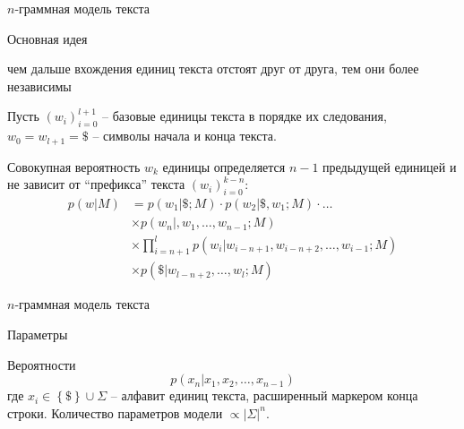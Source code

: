 \documentclass{beamer}
\newcommand{\obj}[1]{\left\{ #1 \right \}}
\newcommand{\brac}[1]{\left ( #1 \right )}
\newcommand{\induc}[1]{\left . #1 \right \vert}
\newcommand{\abs}[1]{\left | #1 \right |}
\begin{document}
\begin{frame}{$n$-граммная модель текста}
  \begin{block}{Основная идея}

     чем дальше вхождения единиц текста отстоят друг от друга, тем они более независимы
  \end{block}

  \begin{block}

    Пусть $\brac{w_i}_{i=0}^{l+1}$ -- базовые единицы текста в порядке их следования, $w_0=w_{l+1}=\$$ -- символы начала и конца текста.

    Совокупная вероятность $w_k$ единицы определяется $n-1$ предыдущей единицей и не зависит от ``префикса'' текста $\brac{w_i}_{i=0}^{k-n}$:
    \begin{align*}
      p\brac{\induc{w}M} &= p\brac{\induc{w_1}\$;M} \cdot p\brac{\induc{w_2}\$,w_1;M} \cdot \ldots \\
        &\times p\brac{\induc{w_n},w_1,\ldots,w_{n-1};M} \\
        &\times \prod_{i=n+1}^l p\brac{\induc{w_i}w_{i-n+1}, w_{i-n+2}, \ldots, w_{i-1};M} \\ 
        &\times p\brac{\induc{\$}w_{l-n+2}, \ldots, w_l;M}
    \end{align*}
  \end{block}
\end{frame}

\begin{frame}{$n$-граммная модель текста}
  \begin{block}{Параметры}

    Вероятности
    \[p\brac{\induc{x_n}x_1, x_2, \ldots, x_{n-1}}\] 
    где $x_i\in \obj{\$}\cup \Sigma$ -- алфавит единиц текста, расширенный маркером конца строки.
    Количество параметров модели $\propto \abs{\Sigma}^n$.
  \end{block}
\end{frame}

\end{document}
